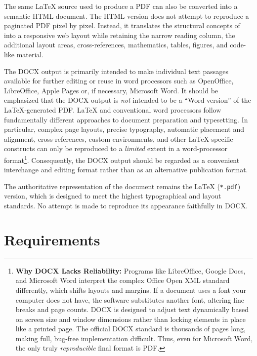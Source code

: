 \documentclass[
11pt,
a4paper,
oneside
]{scrbook}
\begin{document}
{The same \LaTeX{} source used to produce a PDF can also be converted into a
semantic HTML document. The HTML version does not attempt to reproduce a
paginated PDF pixel by pixel. Instead, it translates the structural concepts
of \mdlayout{} into a responsive web layout while retaining the narrow reading
column, the additional layout areas, cross-references, mathematics, tables,
figures, and code-like material. 

The DOCX output is primarily intended to make individual text passages available for further editing or reuse in word processors such as OpenOffice, LibreOffice, Apple Pages or, if necessary, Microsoft Word.
It should be emphasized that the DOCX output is \emph{not} intended to be a “Word version” of the \LaTeX-generated PDF. \LaTeX{} and conventional word processors follow fundamentally different approaches to document preparation and typesetting. In particular, complex page layouts, precise typography, automatic placement and alignment, cross-references, custom environments, and other \LaTeX-specific constructs can only be reproduced to a \emph{limited} extent in a word-processor format\footnote{
\textbf{Why DOCX Lacks Reliability:} Programs like LibreOffice, Google Docs, and Microsoft Word interpret the complex Office Open XML standard differently, which shifts layouts and margins. If a document uses a font your computer does not have, the software substitutes another font, altering line breaks and page counts. DOCX is designed to adjust text dynamically based on screen size and window dimensions rather than locking elements in place like a printed page. The official DOCX standard is thousands of pages long, making full, bug-free implementation difficult. Thus, even for Microsoft Word, the only truly \emph{reproducible} final format is PDF.
}.
Consequently, the DOCX output should be regarded as a convenient interchange and editing format rather than as an alternative publication format. 
\begin{note}
The authoritative representation of the document remains the \LaTeX{} (\texttt{*.pdf}) version, which is designed to meet the highest typographical and layout standards. No attempt is made to reproduce its appearance faithfully in DOCX.
\end{note}


\section{Requirements}

}
\end{document}
